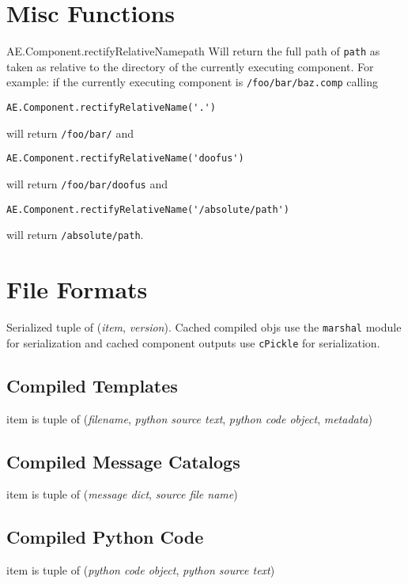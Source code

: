 \section{Misc Functions}
\begin{funcdesc}{AE.Component.rectifyRelativeName}{path}
Will return the full path of \verb!path! as taken as relative to the
directory of the currently executing component.  For example: if the
currently executing component is \verb!/foo/bar/baz.comp! calling 
\begin{verbatim}
AE.Component.rectifyRelativeName('.')
\end{verbatim}
will return \verb!/foo/bar/! and

\begin{verbatim}
AE.Component.rectifyRelativeName('doofus')
\end{verbatim}
will return \verb!/foo/bar/doofus! and

\begin{verbatim}
AE.Component.rectifyRelativeName('/absolute/path')
\end{verbatim}
will return \verb!/absolute/path!.
\end{funcdesc}



\section{File Formats}
Serialized tuple of (\emph{item}, \emph{version}).  Cached compiled
objs use the \texttt{marshal} module for serialization and cached
component outputs use \texttt{cPickle} for serialization.

\subsection{Compiled Templates}
item is tuple of (\emph{filename}, \emph{python source text},
\emph{python code object}, \emph{metadata})

\subsection{Compiled Message Catalogs}
item is tuple of (\emph{message dict}, \emph{source file name})

\subsection{Compiled Python Code}
item is tuple of (\emph{python code object}, \emph{python source text})


